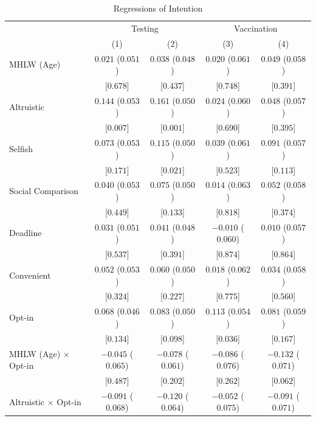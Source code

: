 \documentclass[
      12pt,
    a4paper
]{article}
\begin{document}
\begin{table}

\caption{\label{tab:reg-int}Regressions of Intention}
\centering
\fontsize{9}{11}\selectfont
\begin{threeparttable}
\begin{tabular}[t]{lcccc}
\toprule
\multicolumn{1}{c}{ } & \multicolumn{2}{c}{Testing} & \multicolumn{2}{c}{Vaccination} \\
\cmidrule(l{3pt}r{3pt}){2-3} \cmidrule(l{3pt}r{3pt}){4-5}
  & (1) & (2) & (3) & (4)\\
\midrule
MHLW (Age) & $0.021$ ($0.051$) & $0.038$ ($0.048$) & $0.020$ ($0.061$) & $0.049$ ($0.058$)\\
 & {}[$0.678$] & {}[$0.437$] & {}[$0.748$] & {}[$0.391$]\\
Altruistic & $0.144$ ($0.053$) & $0.161$ ($0.050$) & $0.024$ ($0.060$) & $0.048$ ($0.057$)\\
 & {}[$0.007$] & {}[$0.001$] & {}[$0.690$] & {}[$0.395$]\\
Selfish & $0.073$ ($0.053$) & $0.115$ ($0.050$) & $0.039$ ($0.061$) & $0.091$ ($0.057$)\\
 & {}[$0.171$] & {}[$0.021$] & {}[$0.523$] & {}[$0.113$]\\
Social Comparison & $0.040$ ($0.053$) & $0.075$ ($0.050$) & $0.014$ ($0.063$) & $0.052$ ($0.058$)\\
 & {}[$0.449$] & {}[$0.133$] & {}[$0.818$] & {}[$0.374$]\\
Deadline & $0.031$ ($0.051$) & $0.041$ ($0.048$) & $-0.010$ ($0.060$) & $0.010$ ($0.057$)\\
 & {}[$0.537$] & {}[$0.391$] & {}[$0.874$] & {}[$0.864$]\\
Convenient & $0.052$ ($0.053$) & $0.060$ ($0.050$) & $0.018$ ($0.062$) & $0.034$ ($0.058$)\\
 & {}[$0.324$] & {}[$0.227$] & {}[$0.775$] & {}[$0.560$]\\
Opt-in & $0.068$ ($0.046$) & $0.083$ ($0.050$) & $0.113$ ($0.054$) & $0.081$ ($0.059$)\\
 & {}[$0.134$] & {}[$0.098$] & {}[$0.036$] & {}[$0.167$]\\
MHLW (Age) $\times$ Opt-in & $-0.045$ ($0.065$) & $-0.078$ ($0.061$) & $-0.086$ ($0.076$) & $-0.132$ ($0.071$)\\
 & {}[$0.487$] & {}[$0.202$] & {}[$0.262$] & {}[$0.062$]\\
Altruistic $\times$ Opt-in & $-0.091$ ($0.068$) & $-0.120$ ($0.064$) & $-0.052$ ($0.075$) & $-0.091$ ($0.071$)\\

\end{tabular}
\end{threeparttable}
\end{table}
\end{document}

